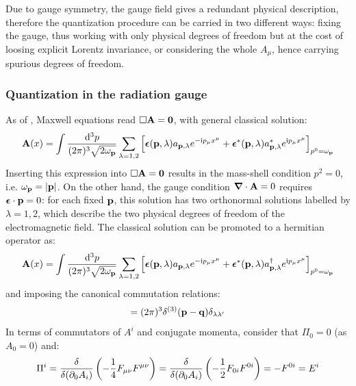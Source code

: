 Due to gauge symmetry, the gauge field gives a redundant physical description, therefore the quantization procedure can be carried in two different ways: fixing the gauge, thus working with only physical degrees of freedom but at the cost of loosing explicit Lorentz invariance, or considering the whole $ A_\mu $, hence carrying spurious degrees of freedom.

\subsubsection{Quantization in the radiation gauge}

As of , Maxwell equations  read $ \Box \mathbf{A} = \mathbf{0} $, with general classical solution:
\begin{equation*}
  \mathbf{A}(x) = \int \frac{\mathrm{d}^3p}{(2\pi)^3 \sqrt{2\omega_{\mathbf{p}}}} \sum_{\lambda = 1,2} \left[ \boldsymbol{\epsilon}(\mathbf{p},\lambda) a_{\mathbf{p},\lambda} e^{-\mathrm{i} p_\mu x^\mu} + \boldsymbol{\epsilon}^*(\mathbf{p},\lambda)a^*_{\mathbf{p},\lambda} e^{\mathrm{i} p_\mu x^\mu} \right]_{p^0 = \omega_{\mathbf{p}}}
\end{equation*}
Inserting this expression into $ \Box \mathbf{A} = \mathbf{0} $ results in the mass-shell condition $ p^2 = 0 $, i.e. $ \omega_{\mathbf{p}} = \left\lvert\mathbf{p}\right\rvert $. On the other hand, the gauge condition $ \boldsymbol{\nabla}\cdot \mathbf{A} = 0 $ requires $ \boldsymbol{\epsilon} \cdot \mathbf{p} = 0 $: for each fixed $ \mathbf{p} $, this solution has two orthonormal solutions labelled by $ \lambda = 1,2 $, which describe the two physical degrees of freedom of the electromagnetic field.
The classical solution can be promoted to a hermitian operator as:
\begin{equation}
  \mathbf{A}(x) = \int \frac{\mathrm{d}^3p}{(2\pi)^3 \sqrt{2\omega_{\mathbf{p}}}} \sum_{\lambda = 1,2} \left[ \boldsymbol{\epsilon}(\mathbf{p},\lambda) a_{\mathbf{p},\lambda} e^{-\mathrm{i} p_\mu x^\mu} + \boldsymbol{\epsilon}^*(\mathbf{p},\lambda)a^\dagger_{\mathbf{p},\lambda} e^{\mathrm{i} p_\mu x^\mu} \right]_{p^0 = \omega_{\mathbf{p}}}
  \label{eq:qed-four-rad}
\end{equation}
and imposing the canonical commutation relations:
\begin{equation}
  [a_{\ve{p},\lambda} , a_{\ve{q},\lambda'}\dg] = (2\pi)^3 \delta^{(3)}(\ve{p} - \ve{q}) \delta_{\lambda \lambda'}
\end{equation}
In terms of commutators of $ A^i $ and conjugate momenta, consider that $ \Pi_0 = 0 $ (as $ A_0 = 0 $) and\footnotemark:
\begin{equation*}
  \Pi^i = \frac{\delta}{\delta(\partial_0 A_i)} \left( -\frac{1}{4} F_{\mu \nu} F^{\mu \nu} \right) = \frac{\delta}{\delta(\partial_0 A_i)} \left( -\frac{1}{2} F_{0i} F^{0i} \right) = - F^{0i} = E^i
\end{equation*}
